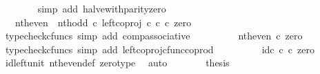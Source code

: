 \begin{isabellebody}
\ \ \ \ \ \ \isamarkupfalse%
\ {\isacharparenleft}{\kern0pt}simp\ add{\isacharcolon}{\kern0pt}\ halve{\isacharunderscore}{\kern0pt}with{\isacharunderscore}{\kern0pt}parity{\isacharunderscore}{\kern0pt}zero{\isacharparenright}{\kern0pt}\isanewline
\ \ \ \ \isamarkupfalse%
\ \isamarkupfalse%
\ {\isachardoublequoteopen}{\isachardot}{\kern0pt}{\isachardot}{\kern0pt}{\isachardot}{\kern0pt}\ {\isacharequal}{\kern0pt}\ {\isacharparenleft}{\kern0pt}nth{\isacharunderscore}{\kern0pt}even\ {\isasymamalg}\ nth{\isacharunderscore}{\kern0pt}odd\ {\isasymcirc}\isactrlsub c\ left{\isacharunderscore}{\kern0pt}coproj\ {\isasymnat}\isactrlsub c\ {\isasymnat}\isactrlsub c{\isacharparenright}{\kern0pt}\ {\isasymcirc}\isactrlsub c\ zero{\isachardoublequoteclose}\isanewline
\ \ \ \ \ \ \isamarkupfalse%
\ {\isacharparenleft}{\kern0pt}typecheck{\isacharunderscore}{\kern0pt}cfuncs{\isacharcomma}{\kern0pt}\ simp\ add{\isacharcolon}{\kern0pt}\ comp{\isacharunderscore}{\kern0pt}associative{}{\isacharparenright}{\kern0pt}\isanewline
\ \ \ \ \isamarkupfalse%
\ \isamarkupfalse%
\ {\isachardoublequoteopen}{\isachardot}{\kern0pt}{\isachardot}{\kern0pt}{\isachardot}{\kern0pt}\ {\isacharequal}{\kern0pt}\ nth{\isacharunderscore}{\kern0pt}even\ {\isasymcirc}\isactrlsub c\ zero{\isachardoublequoteclose}\isanewline
\ \ \ \ \ \ \isamarkupfalse%
\ {\isacharparenleft}{\kern0pt}typecheck{\isacharunderscore}{\kern0pt}cfuncs{\isacharcomma}{\kern0pt}\ simp\ add{\isacharcolon}{\kern0pt}\ left{\isacharunderscore}{\kern0pt}coproj{\isacharunderscore}{\kern0pt}cfunc{\isacharunderscore}{\kern0pt}coprod{\isacharparenright}{\kern0pt}\isanewline
\ \ \ \ \isamarkupfalse%
\ \isamarkupfalse%
\ {\isachardoublequoteopen}{\isachardot}{\kern0pt}{\isachardot}{\kern0pt}{\isachardot}{\kern0pt}\ {\isacharequal}{\kern0pt}\ id\isactrlsub c\ {\isasymnat}\isactrlsub c\ {\isasymcirc}\isactrlsub c\ zero{\isachardoublequoteclose}\isanewline
\ \ \ \ \ \ \isamarkupfalse%
\ id{\isacharunderscore}{\kern0pt}left{\isacharunderscore}{\kern0pt}unit{}\ nth{\isacharunderscore}{\kern0pt}even{\isacharunderscore}{\kern0pt}def{}\ zero{\isacharunderscore}{\kern0pt}type\ \isamarkupfalse%
\ auto\isanewline
\ \ \ \ \isamarkupfalse%
\ \isamarkupfalse%
\ {\isacharquery}{\kern0pt}thesis\isacommand{{\isachardot}{\kern0pt}}\isamarkupfalse%
\isanewline
\ \ \isamarkupfalse%
\isanewline
\isanewline

\end{isabellebody}
